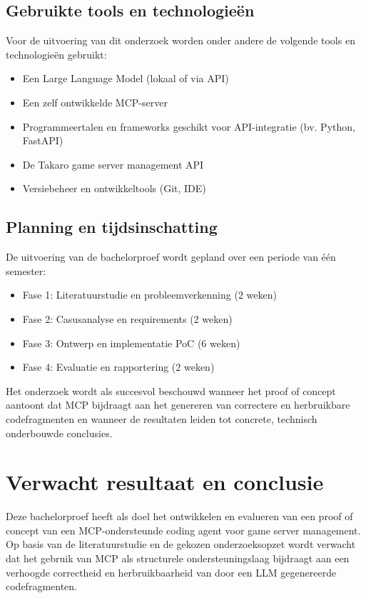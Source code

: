 \subsection{Gebruikte tools en technologieën}

Voor de uitvoering van dit onderzoek worden onder andere de volgende tools en technologieën gebruikt:
\begin{itemize}
  \item Een Large Language Model (lokaal of via API)
  \item Een zelf ontwikkelde MCP-server
  \item Programmeertalen en frameworks geschikt voor API-integratie (bv. Python, FastAPI)
  \item De Takaro game server management API
  \item Versiebeheer en ontwikkeltools (Git, IDE)
\end{itemize}

\subsection{Planning en tijdsinschatting}

De uitvoering van de bachelorproef wordt gepland over een periode van één semester:
\begin{itemize}
  \item Fase 1: Literatuurstudie en probleemverkenning (2 weken)
  \item Fase 2: Casusanalyse en requirements (2 weken)
  \item Fase 3: Ontwerp en implementatie PoC (6 weken)
  \item Fase 4: Evaluatie en rapportering (2 weken)
\end{itemize}

Het onderzoek wordt als succesvol beschouwd wanneer het proof of concept aantoont dat MCP bijdraagt aan het genereren van correctere en herbruikbare codefragmenten en wanneer de resultaten leiden tot concrete, technisch onderbouwde conclusies.

\section{Verwacht resultaat en conclusie}
\label{sec:verwachte_resultaten}

Deze bachelorproef heeft als doel het ontwikkelen en evalueren van een proof of concept van een MCP-ondersteunde coding agent voor game server management. Op basis van de literatuurstudie en de gekozen onderzoeksopzet wordt verwacht dat het gebruik van MCP als structurele ondersteuningslaag bijdraagt aan een verhoogde correctheid en herbruikbaarheid van door een LLM gegenereerde codefragmenten.

